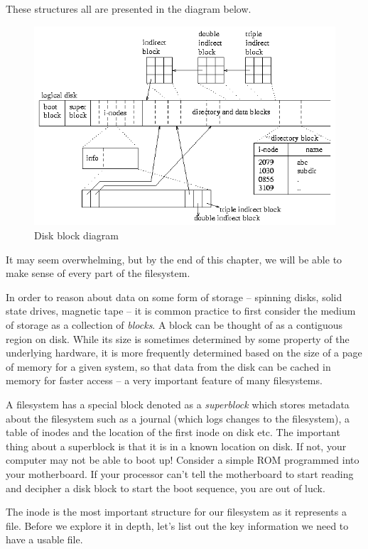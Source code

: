 These structures all are presented in the diagram below.

\begin{figure}[htbp]
\centering
\includegraphics[width=.8\textwidth]{filesystems/images/disk.gif}
\caption{Disk block diagram}
\end{figure}

It may seem overwhelming, but by the end of this chapter, we will be able to make sense of every part of the filesystem.

In order to reason about data on some form of storage -- spinning disks, solid state drives, magnetic tape -- it is common practice to first consider the medium of storage as a collection of \emph{blocks}.
A block can be thought of as a contiguous region on disk.
While its size is sometimes determined by some property of the underlying hardware, it is more frequently determined based on the size of a page of memory for a given system, so that data from the disk can be cached in memory for faster access -- a very important feature of many filesystems.

A filesystem has a special block denoted as a \emph{superblock} which stores metadata about the filesystem such as a journal (which logs changes to the filesystem), a table of inodes and the location of the first inode on disk etc.
The important thing about a superblock is that it is in a known location on disk.
If not, your computer may not be able to boot up!
Consider a simple ROM programmed into your motherboard.
If your processor can't tell the motherboard to start reading and decipher a disk block to start the boot sequence, you are out of luck.

The inode is the most important structure for our filesystem as it represents a file.
Before we explore it in depth, let's list out the key information we need to have a usable file.

